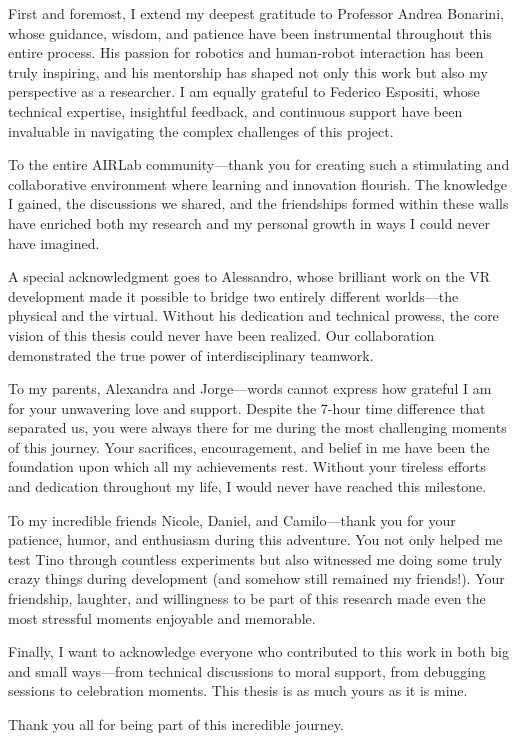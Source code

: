 \documentclass{Configuration_Files/PoliMi3i_thesis}
\begin{document}
First and foremost, I extend my deepest gratitude to Professor Andrea Bonarini, whose guidance, wisdom, and patience have been instrumental throughout this entire process. His passion for robotics and human-robot interaction has been truly inspiring, and his mentorship has shaped not only this work but also my perspective as a researcher. I am equally grateful to Federico Espositi, whose technical expertise, insightful feedback, and continuous support have been invaluable in navigating the complex challenges of this project.

To the entire AIRLab community—thank you for creating such a stimulating and collaborative environment where learning and innovation flourish. The knowledge I gained, the discussions we shared, and the friendships formed within these walls have enriched both my research and my personal growth in ways I could never have imagined.

A special acknowledgment goes to Alessandro, whose brilliant work on the VR development made it possible to bridge two entirely different worlds—the physical and the virtual. Without his dedication and technical prowess, the core vision of this thesis could never have been realized. Our collaboration demonstrated the true power of interdisciplinary teamwork.

To my parents, Alexandra and Jorge—words cannot express how grateful I am for your unwavering love and support. Despite the 7-hour time difference that separated us, you were always there for me during the most challenging moments of this journey. Your sacrifices, encouragement, and belief in me have been the foundation upon which all my achievements rest. Without your tireless efforts and dedication throughout my life, I would never have reached this milestone.

To my incredible friends Nicole, Daniel, and Camilo—thank you for your patience, humor, and enthusiasm during this adventure. You not only helped me test Tino through countless experiments but also witnessed me doing some truly crazy things during development (and somehow still remained my friends!). Your friendship, laughter, and willingness to be part of this research made even the most stressful moments enjoyable and memorable.

Finally, I want to acknowledge everyone who contributed to this work in both big and small ways—from technical discussions to moral support, from debugging sessions to celebration moments. This thesis is as much yours as it is mine.

Thank you all for being part of this incredible journey.

\cleardoublepage
\end{document}
